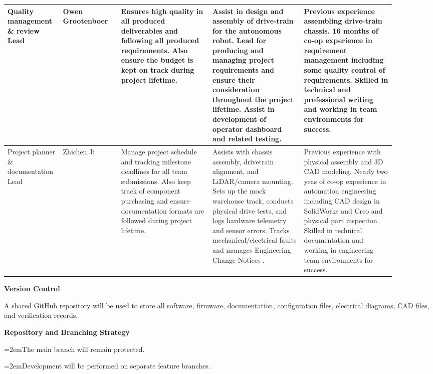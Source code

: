 \documentclass[12pt,a4paper]{article}
\begin{document}
\begin{landscape}
\begin{longtable}{|p{0.10\linewidth}|p{0.14\linewidth}|p{0.22\linewidth}|p{0.22\linewidth}|p{0.22\linewidth}|}
Quality management \& review Lead & Owen Grootenboer & Ensures high quality in all produced deliverables and following all produced requirements. Also ensure the budget is kept on track during project lifetime. & Assist in design and assembly of drive-train for the autonomous robot. Lead for producing and managing project requirements and ensure their consideration throughout the project lifetime. Assist in development of operator dashboard and related testing. & Previous experience assembling drive-train chassis. 16 months of co-op experience in requirement management including some quality control of requirements. Skilled in technical and professional writing and working in team environments for success. \\ \hline
Project planner \& documentation Lead & Zhichen Ji & Manage project schedule and tracking milestone deadlines for all team submissions. Also keep track of component purchasing and ensure documentation formats are followed during project lifetime. & Assists with chassis assembly, drivetrain alignment, and LiDAR/camera mounting. Sets up the mock warehouse track, conducts physical drive tests, and logs hardware telemetry and sensor errors. Tracks mechanical/electrical faults and manages Engineering Change Notices . & Previous experience with physical assembly and 3D CAD modeling.  Nearly two yeas  of co-op experience in automation engineering including CAD design in SolidWorks and Creo and physical part inspection. Skilled in technical documentation and working in engineering team environments for success. \\ \hline
\end{longtable}
\end{landscape}
\par\medskip\noindent\textbf{Version Control}\par\smallskip
\noindent A shared GitHub repository will be used to store all software, firmware, documentation, configuration files, electrical diagrams, CAD files, and verification records.\par
\par\medskip\noindent\textbf{Repository and Branching Strategy}\par\smallskip
\par\noindent\hangindent=2em\hspace*{1em}\textbullet\hspace{0.5em}The main branch will remain protected.\par
\par\noindent\hangindent=2em\hspace*{1em}\textbullet\hspace{0.5em}Development will be performed on separate feature branches.\par
\end{document}
